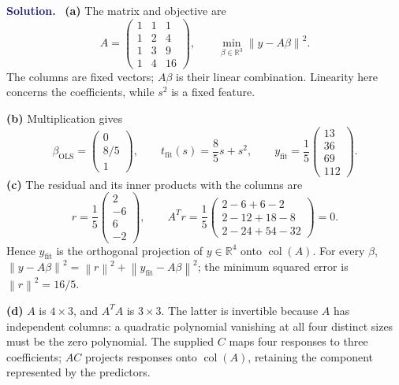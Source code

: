 \documentclass[11pt]{article}
\newcommand{\R}{\mathbb R}
\newcommand{\norm}[1]{\left\lVert#1\right\rVert}
\newcommand{\col}{\operatorname{col}}
\newcommand{\ols}{\mathrm{OLS}}
\newenvironment{answer}{\par\medskip\noindent\textcolor{MidnightBlue}{\textbf{Solution.}}\ }{\par\medskip}
\begin{document}
\begin{answer}
\textbf{(a)} The matrix and objective are
\[
 A=\begin{pmatrix}1&1&1\\1&2&4\\1&3&9\\1&4&16\end{pmatrix},
 \qquad \min_{\beta\in\R^3}\norm{y-A\beta}^2.
\]
The columns are fixed vectors; $A\beta$ is their linear combination.
Linearity here concerns the coefficients, while $s^2$ is a fixed feature.

\textbf{(b)} Multiplication gives
\[
 \beta_{\ols}=\begin{pmatrix}0\\8/5\\1\end{pmatrix},\qquad
 t_{\mathrm{fit}}(s)=\frac85s+s^2,\qquad
 y_{\mathrm{fit}}=\frac15\begin{pmatrix}13\\36\\69\\112\end{pmatrix}.
\]
\textbf{(c)} The residual and its inner products with the columns are
\[
 r=\frac15\begin{pmatrix}2\\-6\\6\\-2\end{pmatrix},\qquad
 A^Tr=\frac15\begin{pmatrix}
 2-6+6-2\\2-12+18-8\\2-24+54-32
 \end{pmatrix}=0.
\]
Hence $y_{\mathrm{fit}}$ is the orthogonal projection of $y\in\R^4$ onto
$\col(A)$. For every $\beta$,
$\norm{y-A\beta}^2=\norm{r}^2+\norm{y_{\mathrm{fit}}-A\beta}^2$;
the minimum squared error is $\norm{r}^2=16/5$.

\textbf{(d)} $A$ is $4\times3$, and $A^TA$ is $3\times3$. The latter is invertible
because $A$ has independent columns: a quadratic polynomial vanishing
at all four distinct sizes must be the zero polynomial. The supplied
$C$ maps four responses to three coefficients; $AC$ projects responses
onto $\col(A)$, retaining the component represented by the predictors.
\end{answer}

\newpage
\end{document}

